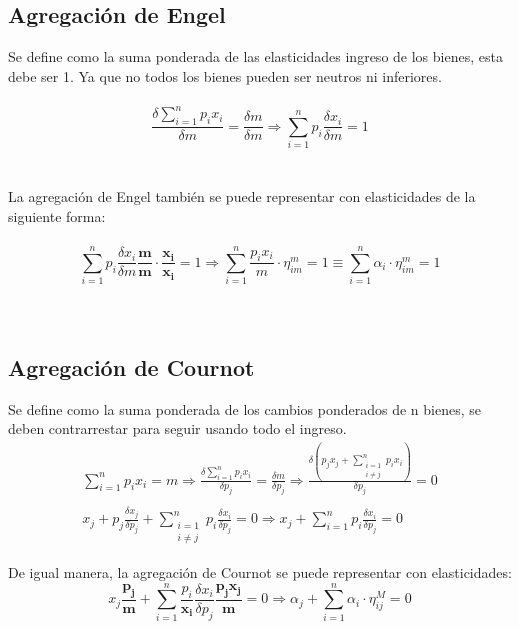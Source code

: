 \documentclass{article}
\begin{document}
\subsection{Agregación de Engel}
Se define como la suma ponderada de las elasticidades ingreso de los bienes, esta debe ser 1. Ya que no todos los bienes pueden ser neutros ni inferiores. \\\\
$$\frac{\delta \sum_{i=1}^np_ix_i}{\delta m}=\frac{\delta m}{\delta m}\Rightarrow \sum_{i=1}^np_i\frac{\delta x_i}{\delta m}=1$$\\\\
La agregación de Engel también se puede representar con elasticidades de la siguiente forma: \\\\
$$\sum_{i=1}^np_i\frac{\delta x_i}{\delta m} \mathbf{\frac{m}{m} \cdot \frac{x_i}{x_i}}=1\Rightarrow \sum_{i=1}^n\frac{p_ix_i}{m}\cdot \eta_{im}^m=1\equiv \sum_{i=1}^n\alpha_i \cdot \eta_{im}^m=1$$\\\\
\subsection{Agregación de Cournot}
Se define como la suma ponderada de los cambios ponderados de n bienes, se deben contrarrestar para seguir usando todo el ingreso. 
\begin{align*}
    \sum_{i=1}^np_ix_i=m \Rightarrow \frac{\delta \sum_{i=1}^np_ix_i}{\delta p_j}=\frac{\delta m}{\delta p_j}\Rightarrow \frac{\delta (p_jx_j+\sum_{\substack{i=1\\i\neq j}}^np_ix_i)}{\delta p_j}=0\\\\
    x_j+p_j\frac{\delta x_j}{\delta p_j}+\sum_{\substack{i=1\\i\neq j}}^np_i\frac{\delta x_i}{\delta p_j}=0\Rightarrow x_j+\sum_{i=1}^np_i\frac{\delta x_i}{\delta p_j}=0
\end{align*}

De igual manera, la agregación de Cournot se puede representar con elasticidades: 
$$x_j\mathbf{\frac{p_j}{m}}+\sum_{i=1}^n \frac{p_i}{\mathbf{x_i}}\frac{\delta x_i}{\delta p_j} \mathbf{{\frac{p_j x_j}{m}}}=0 \Rightarrow \alpha_j + \sum_{i=1}^n \alpha_i \cdot \eta_{ij}^M=0 $$
\end{document}
